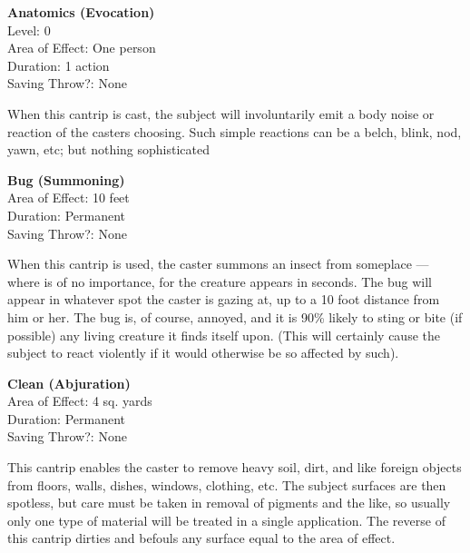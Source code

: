 \documentclass[letterpaper,sansserif,tightsqueeze]{rpg-module}
\begin{document}
\begin{samepage}
\textbf{Anatomics (Evocation)}\\
Level: 0\\
Area of Effect: One person\\
Duration: 1 action\\
Saving Throw?: None

\nopagebreak	
When this cantrip is cast, the subject will involuntarily emit a body noise or reaction of the casters choosing. Such simple reactions can be a belch, blink, nod, yawn, etc; but nothing sophisticated
\end{samepage}

\begin{samepage}	
\textbf{Bug (Summoning)}\\
Area of Effect: 10 feet\\
Duration: Permanent\\
Saving Throw?: None

\nopagebreak
When this cantrip is used, the caster summons an insect from someplace — where is of no importance, for the creature appears in seconds. The bug will appear in whatever spot the caster is gazing at, up to a 10 foot distance from him or her. The bug is, of course, annoyed, and it is 90\% likely to sting or bite (if possible) any living creature it finds itself upon. (This will certainly cause the subject to react violently if it would otherwise be so affected by such).
\end{samepage}

\begin{samepage}	
\textbf{Clean (Abjuration)}\\
Area of Effect: 4 sq. yards\\
Duration: Permanent\\
Saving Throw?: None
	
\nopagebreak
This cantrip enables the caster to remove heavy soil, dirt, and like foreign objects from floors, walls, dishes, windows, clothing, etc. The subject surfaces are then spotless, but care must be taken in removal of pigments and the like, so usually only one type of material will be treated in a single application. The reverse of this cantrip dirties and befouls any surface equal to the area of effect.
\end{samepage}
\end{document}

